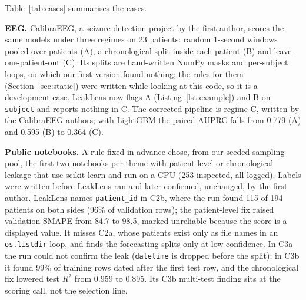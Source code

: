 \documentclass[conference]{IEEEtran}
\newcommand{\tool}{LeakLens}
\newcommand{\code}[1]{\texttt{#1}}
\begin{document}
Table~\ref{tab:cases} summarises the cases.

\textbf{EEG.} CalibraEEG, a seizure-detection project by the first author, scores the same models under three
regimes on 23 patients: random 1-second windows pooled over patients (A), a chronological split inside each
patient (B) and leave-one-patient-out (C). Its splits are hand-written NumPy masks and per-subject loops, on which our first version found nothing; the rules for
them (Section~\ref{sec:static}) were written while looking at this code, so it is a development case. \tool{} now flags A (Listing~\ref{lst:example}) and B on \code{subject} and
reports nothing in C. The corrected pipeline is regime C, written by the CalibraEEG authors; with LightGBM the
paired AUPRC falls from 0.779 (A) and 0.595 (B) to 0.364 (C).

\textbf{Public notebooks.} A rule fixed in advance chose, from our seeded sampling pool, the first two notebooks per
theme with patient-level or chronological leakage that use scikit-learn and run on a CPU (253 inspected, all
logged). Labels were written before \tool{} ran and later confirmed, unchanged, by the first author. \tool{} names
\code{patient\_id} in C2b, where the run found 115 of 194 patients on both sides (96\% of validation rows); the
patient-level fix raised validation SMAPE from 84.7 to 98.5, marked unreliable because the score is a displayed
value. It misses C2a, whose patients exist only as file names in an \code{os.listdir} loop, and finds the
forecasting splits only at low confidence. In C3a the run could not confirm the leak (\code{datetime} is dropped
before the split); in C3b it found 99\% of training rows dated after the first test row, and the chronological fix
lowered test $R^2$ from 0.959 to 0.895. Its C3b multi-test finding sits at the scoring call, not the selection line.
\end{document}
